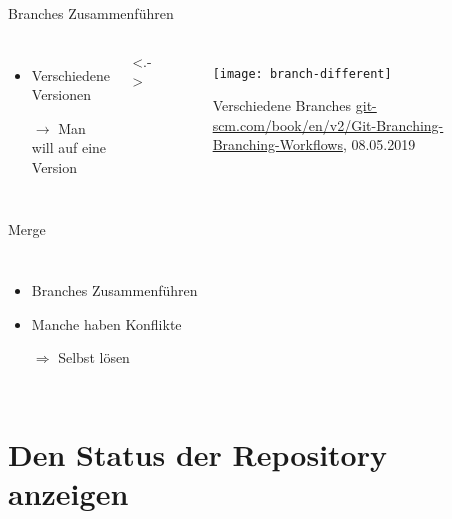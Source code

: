 \documentclass{beamer}
\begin{document}
    \begin{frame}{Branches Zusammenführen}
      \begin{columns}
          \begin{itemize}[<+->]
            \item Verschiedene Versionen
            \item[$\rightarrow$] Man will auf eine Version
          \end{itemize}

          \onslide<.->{
            \begin{figure}
              \texttt{[image: branch-different]}
              \caption{Verschiedene Branches \tiny{\url{git-scm.com/book/en/v2/Git-Branching-Branching-Workflows}, 08.05.2019}}
            \end{figure}
          }
      \end{columns}
    \end{frame}

    \begin{frame}{Merge}
      \begin{columns}
          \begin{itemize}[<+->]
            \item Branches Zusammenführen
            \item Manche haben Konflikte
            \item[$\Rightarrow$] Selbst lösen
          \end{itemize}
      \end{columns}
    \end{frame}

  \section[Status]{Den Status der Repository anzeigen}
\end{document}
